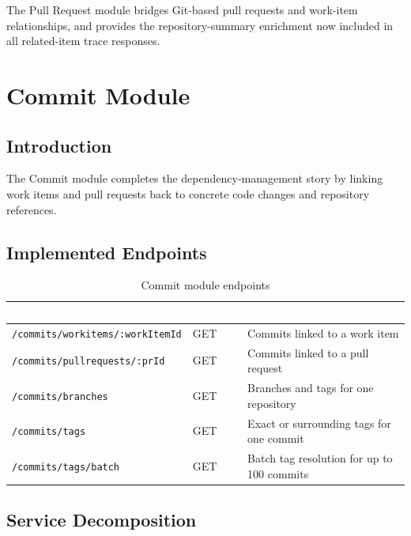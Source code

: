\documentclass[12pt,a4paper]{report}
\newcommand{\code}[1]{\texttt{\small\color{codered}#1}}
\begin{document}
The Pull Request module bridges Git-based pull requests and work-item
relationships, and provides the repository-summary enrichment now included in all
related-item trace responses.

\chapter{Commit Module}

\section{Introduction}

The Commit module completes the dependency-management story by linking work
items and pull requests back to concrete code changes and repository references.

\section{Implemented Endpoints}

\begin{table}[H]
\centering
\caption{Commit module endpoints}
\label{tab:commit-endpoints}
\begin{tabularx}{\textwidth}{|p{5cm}|p{1.8cm}|X|}
\hline
\rowcolor{primary}
  \textcolor{white}{\textbf{Endpoint}} &
  \textcolor{white}{\textbf{Method}} &
  \textcolor{white}{\textbf{Purpose}} \\
\hline
\code{/commits/workitems/:workItemId} & GET & Commits linked to a work item \\
\code{/commits/pullrequests/:prId}    & GET & Commits linked to a pull request \\
\code{/commits/branches}              & GET & Branches and tags for one repository \\
\code{/commits/tags}                  & GET & Exact or surrounding tags for one commit \\
\code{/commits/tags/batch}            & GET & Batch tag resolution for up to 100 commits \\
\hline
\end{tabularx}
\end{table}

\section{Service Decomposition}
\end{document}
